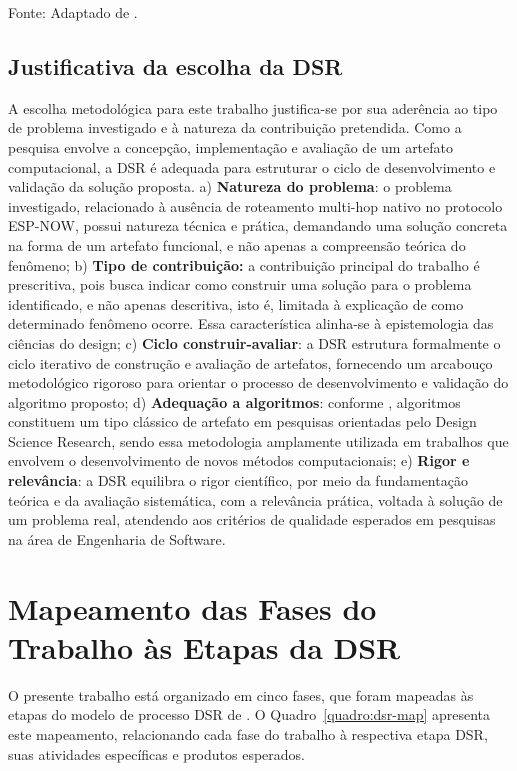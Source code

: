 Fonte: Adaptado de .

\subsection{Justificativa da escolha da
DSR}\label{justificativa-da-escolha-da-dsr}

A escolha metodológica para este trabalho justifica-se por sua aderência
ao tipo de problema investigado e à natureza da contribuição pretendida.
Como a pesquisa envolve a concepção, implementação e avaliação de um
artefato computacional, a DSR é adequada para estruturar o ciclo de
desenvolvimento e validação da solução proposta. a) \textbf{Natureza do
problema}: o problema investigado, relacionado à ausência de roteamento
multi-hop nativo no protocolo ESP-NOW, possui natureza técnica e
prática, demandando uma solução concreta na forma de um artefato
funcional, e não apenas a compreensão teórica do fenômeno; b)
\textbf{Tipo de contribuição:} a contribuição principal do trabalho é
prescritiva, pois busca indicar como construir uma solução para o
problema identificado, e não apenas descritiva, isto é, limitada à
explicação de como determinado fenômeno ocorre. Essa característica
alinha-se à epistemologia das ciências do design; c) \textbf{Ciclo
construir-avaliar}: a DSR estrutura formalmente o ciclo iterativo de
construção e avaliação de artefatos, fornecendo um arcabouço
metodológico rigoroso para orientar o processo de desenvolvimento e
validação do algoritmo proposto; d) \textbf{Adequação a algoritmos}:
conforme , algoritmos constituem um tipo
clássico de artefato em pesquisas orientadas pelo Design Science
Research, sendo essa metodologia amplamente utilizada em trabalhos que
envolvem o desenvolvimento de novos métodos computacionais; e)
\textbf{Rigor e relevância}: a DSR equilibra o rigor científico, por
meio da fundamentação teórica e da avaliação sistemática, com a
relevância prática, voltada à solução de um problema real, atendendo aos
critérios de qualidade esperados em pesquisas na área de Engenharia de
Software.

\section{Mapeamento das Fases do Trabalho às Etapas da
DSR}\label{mapeamento-das-fases-do-trabalho-uxe0s-etapas-da-dsr}

O presente trabalho está organizado em cinco fases, que foram mapeadas
às etapas do modelo de processo DSR de . O
Quadro~\ref{quadro:dsr-map} apresenta este mapeamento, relacionando cada fase do trabalho à
respectiva etapa DSR, suas atividades específicas e produtos esperados.

